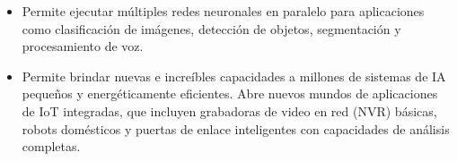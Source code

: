 \begin{itemize}
  \item Permite ejecutar múltiples redes neuronales en paralelo para aplicaciones como clasificación de imágenes, detección de objetos, segmentación y procesamiento de voz.
  \item Permite brindar nuevas e increíbles capacidades a millones de sistemas de IA pequeños y energéticamente eficientes. Abre nuevos mundos de aplicaciones de IoT integradas, que incluyen grabadoras de video en red (NVR) básicas, robots domésticos y puertas de enlace inteligentes con capacidades de análisis completas.
\end{itemize}
